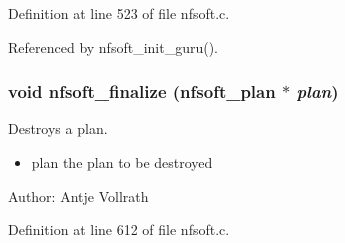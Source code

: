 Definition at line 523 of file nfsoft.c.

Referenced by nfsoft\_\-init\_\-guru().\hypertarget{group__nfsoft_g30b5c6ae1ff496680f11ddcaad2d5a47}{
\subsubsection{\setlength{\rightskip}{0pt plus 5cm}void nfsoft\_\-finalize ({\bf nfsoft\_\-plan} $\ast$ {\em plan})}}
\label{group__nfsoft_g30b5c6ae1ff496680f11ddcaad2d5a47}


Destroys a plan. 

\begin{itemize}
\item plan the plan to be destroyed\end{itemize}
\begin{Desc}
\item[Author:]Antje Vollrath \end{Desc}


Definition at line 612 of file nfsoft.c.